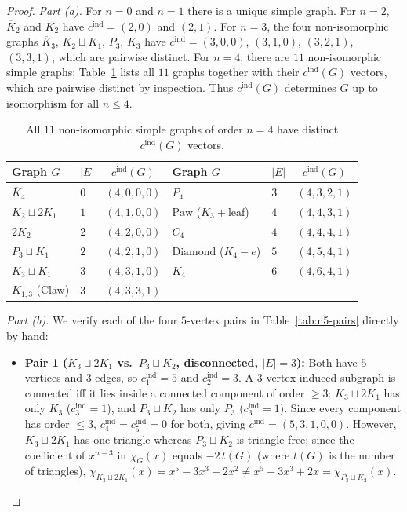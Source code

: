 \documentclass[11pt]{article}
\theoremstyle{definition}
\newcommand{\cind}{c^{\mathrm{ind}}}
\begin{document}
\begin{proof}
\emph{Part (a).} For $n = 0$ and $n = 1$ there is a unique simple graph. For $n = 2$, $\overline{K}_2$ and $K_2$ have $\cind = (2,0)$ and $(2,1)$. For $n = 3$, the four non-isomorphic graphs $\overline{K}_3$, $K_2 \sqcup K_1$, $P_3$, $K_3$ have $\cind = (3,0,0)$, $(3,1,0)$, $(3,2,1)$, $(3,3,1)$, which are pairwise distinct. For $n = 4$, there are $11$ non-isomorphic simple graphs; Table~\ref{tab:n4-table} lists all $11$ graphs together with their $\cind(G)$ vectors, which are pairwise distinct by inspection. Thus $\cind(G)$ determines $G$ up to isomorphism for all $n \le 4$.

\begin{table}[ht]
\centering
\small
\caption{All $11$ non-isomorphic simple graphs of order $n = 4$ have distinct $\cind(G)$ vectors.}
\label{tab:n4-table}
\begin{tabular}{@{}llcllc@{}}
\toprule
\textbf{Graph $G$} & $|E|$ & $\cind(G)$ & \textbf{Graph $G$} & $|E|$ & $\cind(G)$ \\
\midrule
$\overline{K}_4$ & $0$ & $(4, 0, 0, 0)$ & $P_4$ & $3$ & $(4, 3, 2, 1)$ \\
$K_2 \sqcup 2K_1$ & $1$ & $(4, 1, 0, 0)$ & $\mathrm{Paw}$ ($K_3 + \text{leaf}$) & $4$ & $(4, 4, 3, 1)$ \\
$2K_2$ & $2$ & $(4, 2, 0, 0)$ & $C_4$ & $4$ & $(4, 4, 4, 1)$ \\
$P_3 \sqcup K_1$ & $2$ & $(4, 2, 1, 0)$ & $\mathrm{Diamond}$ ($K_4 - e$) & $5$ & $(4, 5, 4, 1)$ \\
$K_3 \sqcup K_1$ & $3$ & $(4, 3, 1, 0)$ & $K_4$ & $6$ & $(4, 6, 4, 1)$ \\
$K_{1,3}$ (Claw) & $3$ & $(4, 3, 3, 1)$ & & & \\
\bottomrule
\end{tabular}
\end{table}

\emph{Part (b).} We verify each of the four $5$-vertex pairs in Table~\ref{tab:n5-pairs} directly by hand:
\begin{itemize}
  \item \textbf{Pair 1 ($K_3 \sqcup 2K_1$ vs.\ $P_3 \sqcup K_2$, disconnected, $|E| = 3$):} Both have $5$ vertices and $3$ edges, so $\cind_1 = 5$ and $\cind_2 = 3$. A $3$-vertex induced subgraph is connected iff it lies inside a connected component of order $\ge 3$: $K_3 \sqcup 2K_1$ has only $K_3$ ($\cind_3 = 1$), and $P_3 \sqcup K_2$ has only $P_3$ ($\cind_3 = 1$). Since every component has order $\le 3$, $\cind_4 = \cind_5 = 0$ for both, giving $\cind = (5,3,1,0,0)$. However, $K_3 \sqcup 2K_1$ has one triangle whereas $P_3 \sqcup K_2$ is triangle-free; since the coefficient of $x^{n-3}$ in $\chi_G(x)$ equals $-2\,t(G)$ (where $t(G)$ is the number of triangles), $\chi_{K_3 \sqcup 2K_1}(x) = x^5 - 3x^3 - 2x^2 \ne x^5 - 3x^3 + 2x = \chi_{P_3 \sqcup K_2}(x)$.


\end{itemize}
\end{proof}
\end{document}
